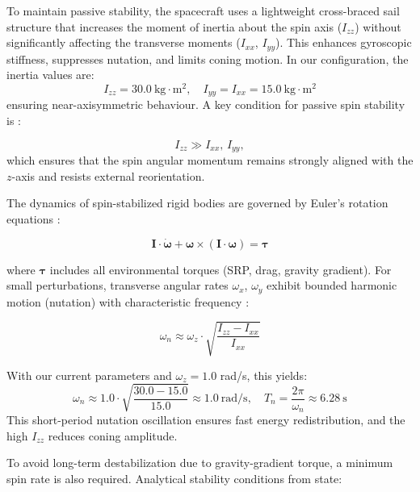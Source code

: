 \documentclass[final,3p,times,twocolumn]{elsarticle}
\begin{document}
\vspace{5pt}
\par\noindent To maintain passive stability, the spacecraft uses a lightweight cross-braced sail structure that increases the moment of inertia about the spin axis ($I_{zz}$) without significantly affecting the transverse moments ($I_{xx}$, $I_{yy}$). This enhances gyroscopic stiffness, suppresses nutation, and limits coning motion. In our configuration, the inertia values are: 
\[
I_{zz} = 30.0~\text{kg}\cdot\text{m}^2,\quad I_{yy} = I_{xx} = 15.0~\text{kg}\cdot\text{m}^2
\]
ensuring near-axisymmetric behaviour. A key condition for passive spin stability is \citep{hubert2008}:

\begin{equation}
I_{zz} \gg I_{xx},\, I_{yy},
\end{equation}
which ensures that the spin angular momentum remains strongly aligned with the $z$-axis and resists external reorientation.

\vspace{5pt}
\par\noindent The dynamics of spin-stabilized rigid bodies are governed by Euler’s rotation equations \citep{goldsteinL13}:

\begin{equation}
\mathbf{I} \cdot \dot{\boldsymbol{\omega}} + \boldsymbol{\omega} \times (\mathbf{I} \cdot \boldsymbol{\omega}) = \boldsymbol{\tau}
\end{equation}

where $\boldsymbol{\tau}$ includes all environmental torques (SRP, drag, gravity gradient). For small perturbations, transverse angular rates $\omega_x$, $\omega_y$ exhibit bounded harmonic motion (nutation) with characteristic frequency \citep{hubert2008}:

\begin{equation}
\omega_n \approx \omega_z \cdot \sqrt{\frac{I_{zz} - I_{xx}}{I_{xx}}}
\end{equation}

\noindent With our current parameters and $\omega_z = 1.0$ rad/s, this yields:
\[
\omega_n \approx 1.0 \cdot \sqrt{\frac{30.0 - 15.0}{15.0}} \approx 1.0~\text{rad/s}, \quad
T_n = \frac{2\pi}{\omega_n} \approx 6.28~\text{s}
\]
\noindent This short-period nutation oscillation ensures fast energy redistribution, and the high $I_{zz}$ reduces coning amplitude.

\vspace{5pt}
\par\noindent To avoid long-term destabilization due to gravity-gradient torque, a minimum spin rate is also required. Analytical stability conditions from \cite{stability} state:
\end{document}
